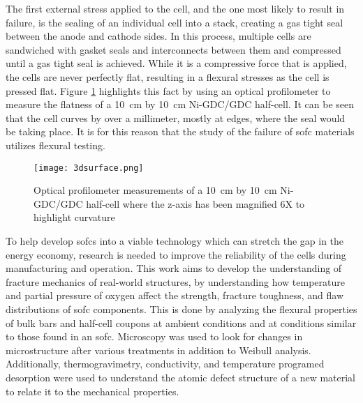     The first external stress applied to the cell, and the one most likely to result in failure, is the  sealing of an individual cell into a stack, creating a gas tight seal between the anode and cathode sides.
    In this process, multiple cells are sandwiched with gasket seals and interconnects between them and compressed until a gas tight seal is achieved.
    While it is a compressive force that is applied, the cells are never perfectly flat, resulting in a flexural stresses as the cell is pressed flat.
    Figure \ref{fig:flatness} highlights this fact by using an optical profilometer to measure the flatness of a \SI{10}{\centi\meter} by \SI{10}{\centi\meter} Ni-GDC/GDC half-cell.
    It can be seen that the cell curves by over a millimeter, mostly at edges, where the seal would be taking place.
    It is for this reason that the study of the failure of \gls{sofc} materials utilizes flexural testing.

    \begin{figure}
      \centering
      \texttt{[image: 3dsurface.png]}
      \caption{Optical profilometer measurements of a \SI{10}{\centi\meter} by \SI{10}{\centi\meter} Ni-GDC/GDC half-cell where the z-axis has been magnified 6X to highlight curvature}\label{fig:flatness}
    \end{figure}



    To help develop \glspl{sofc} into a viable technology which can stretch the gap in the energy economy, research is needed to improve the reliability of the cells during manufacturing and operation.
    This work aims to develop the understanding of fracture mechanics of real-world structures, by understanding how temperature and partial pressure of oxygen affect the strength, fracture toughness, and flaw distributions of \gls{sofc} components.
    This is done by analyzing the flexural properties of bulk bars and half-cell coupons at ambient conditions and at conditions similar to those found in an \gls{sofc}.
    Microscopy was used to look for changes in microstructure after various treatments in addition to Weibull analysis.
    Additionally, thermogravimetry, conductivity, and temperature programed desorption were used to understand the atomic defect structure of a new material to relate it to the mechanical properties.

